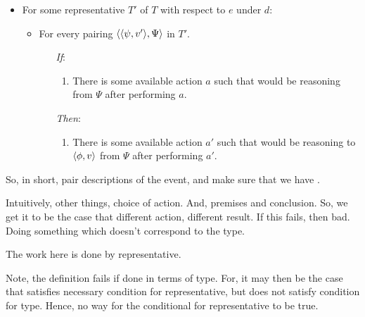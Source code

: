 \begin{note}
\begin{idea}[\tR{2}]
    \begin{itemize}[noitemsep]
    \item
      For some representative \(T'\) of \(T\) with respect to \(e\) under \(d\):
      \begin{itemize}[noitemsep]
      \item
        For every pairing \(\langle \langle \psi, v' \rangle, \Psi \rangle\) in \(T'\).
        \begin{itemize}[noitemsep]
        \item[\emph{If}:]
          \begin{enumerate}[label=\alph*., ref=(\alph*), series=tRSketch]
          \item
            There is some available action \(a\) such that \vAgent{} would be reasoning from \(\Psi\) after performing \(a\).
          \end{enumerate}
        \item[\emph{Then}:]
          \begin{enumerate}[label=\alph*., ref=(\alph*), resume*=tRSketch]
          \item
            There is some available action \(a'\) such that \vAgent{} would be reasoning to \(\langle \phi, v \rangle\) from \(\Psi\) after performing \(a'\).
          \end{enumerate}
        \end{itemize}
      \end{itemize}
    \end{itemize}
    \vspace{-\baselineskip}
  \end{idea}

  So, in short, pair descriptions of the event, and make sure that we have .

  Intuitively, other things, choice of action.
  And, premises and conclusion.
  So, we get it to be the case that different action, different result.
  If this fails, then bad.
  Doing something which doesn't correspond to the type.
\end{note}

\begin{note}
  The work here is done by representative.

  Note, the definition fails if done in terms of type.
  For, it may then be the case that satisfies necessary condition for representative, but does not satisfy condition for type.
  Hence, no way for the conditional for representative to be true.
\end{note}


